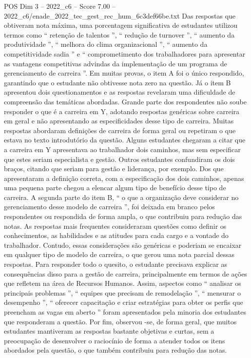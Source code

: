 \begin{textsample}{POS Dim 3 – 2022\_c6 – Score 7.00 – 2022\_c6/enade\_2022\_tec\_gest\_rec\_hum\_6c3def66be.txt}
Das respostas que obtiveram nota máxima, uma porcentagem significativa de estudantes utilizou termos como “ retenção de talentos ”, “ redução de turnover ”, “ aumento da produtividade ”, “ melhora do clima organizacional ”, “ aumento da competitividade sadia ” e “ comprometimento dos trabalhadores para apresentar as vantagens competitivas advindas da implementação de um programa de gerenciamento de carreira ”.
Em muitas provas, o item A foi o único respondido, garantindo que o estudante não obtivesse nota zero na questão.
Já o item B apresentou dois questionamentos e as respostas revelaram uma dificuldade de compreensão das temáticas abordadas.
Grande parte dos respondentes não soube responder o que é a carreira em Y, adotando respostas genéricas sobre carreira em geral e não apresentando as especificidades desse tipo de carreira.
Muitas respostas abordaram definições de carreira de forma geral ou repetiram o que estava no texto introdutório da questão.
Alguns estudantes chegaram a citar que a carreira em Y apresentava ao trabalhador dois caminhos, mas sem especificar que estes seriam especialista e gestão.
Outros estudantes confundiram os dois braços, citando que seriam para gestão e liderança, por exemplo.
Dos que apresentaram a definição correta, com a especificação dos dois caminhos, apenas uma pequena parte chegou a elencar algum tipo de benefício desse tipo de carreira.
A segunda parte do item B, “ o que a organização deve considerar no gerenciamento desse modelo de carreira ”, foi deixada em branco pelos respondentes ou respondida de forma ampla, o que contribuiu para redução das notas.
As respostas mais frequentes consideraram questões como definir os conhecimentos, as habilidades e as atitudes para cada cargo e a vontade do trabalhador.
Contudo, essas considerações são genéricas e poderiam se encaixar em qualquer tipo de modelo de carreira, o que gerou uma nota parcial dessas respostas.
Para responder todo o quesito, o estudante precisava explicar as consequências disso para a gestão de carreira, principalmente em termos de ações que refletem na área de Recursos Humanos.
Assim, aspectos como “ analisar os principais problemas ”, “ equipes que precisam de remodelação ”, “ mensurar o desempenho ”, “ oferecer capacitação e criar estratégias para obter os perfis que preencham as vagas em aberto ” foram apresentados pela minoria dos estudantes que responderam a questão.
Por fim, observou -se, de forma geral, que muitos estudantes mantiveram as respostas bastante objetivas e curtas, sem a preocupação de desenvolver o raciocínio de forma a atender todos os itens abordados pela questão, o que também contribuiu para redução das notas.

\end{textsample}
